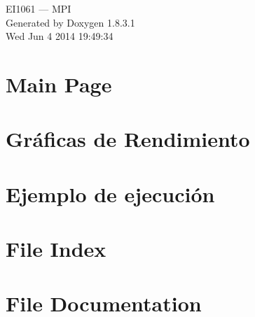 \documentclass{book}
\begin{document}
\hypersetup{pageanchor=false,citecolor=blue}
\begin{titlepage}
\vspace*{7cm}
\begin{center}
{\Large E\-I1061 --- M\-P\-I }\\
\vspace*{1cm}
{\large Generated by Doxygen 1.8.3.1}\\
\vspace*{0.5cm}
{\small Wed Jun 4 2014 19:49:34}\\
\end{center}
\end{titlepage}
\clearemptydoublepage
{}
\tableofcontents
\clearemptydoublepage
{}
\hypersetup{pageanchor=true,citecolor=blue}
\chapter{Main Page}
\label{index}\hypertarget{index}{}
\chapter{Gráficas de Rendimiento}
\label{md_performance}
\hypertarget{md_performance}{}

\chapter{Ejemplo de ejecución}
\label{md_usage}
\hypertarget{md_usage}{}

\chapter{File Index}

\chapter{File Documentation}









\printindex
\end{document}
